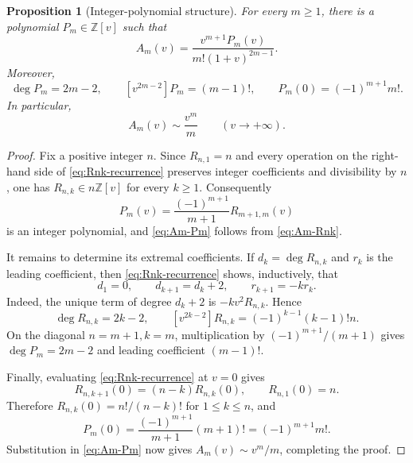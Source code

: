 \documentclass[11pt,oneside]{article}
\theoremstyle{plain}
\newtheorem{proposition}[theorem]{Proposition}
\theoremstyle{definition}
\theoremstyle{remark}
\begin{document}
\begin{proposition}[Integer-polynomial structure]
\label{prop:Pm-structure}
For every \(m\ge1\), there is a polynomial \(P_m\in\mathbb{Z}[v]\) such that
\begin{equation}
 A_m(v)=\frac{v^{m+1}P_m(v)}{m!(1+v)^{2m-1}}.
 \label{eq:Am-Pm}
\end{equation}
Moreover,
\begin{equation}
 \deg P_m=2m-2,
 \qquad [v^{2m-2}]P_m=(m-1)!,
 \qquad P_m(0)=(-1)^{m+1}m!.
 \label{eq:Pm-data}
\end{equation}
In particular,
\begin{equation}
 A_m(v)\sim\frac{v^m}{m}
 \qquad (v\to+\infty).
 \label{eq:Am-leading}
\end{equation}
\end{proposition}

\begin{proof}
Fix a positive integer \(n\).  Since \(R_{n,1}=n\) and every operation on the
right-hand side of \eqref{eq:Rnk-recurrence} preserves integer coefficients
and divisibility by \(n\), one has
\(R_{n,k}\in n\mathbb Z[v]\) for every \(k\ge1\).  Consequently
\[
 P_m(v)=\frac{(-1)^{m+1}}{m+1}R_{m+1,m}(v)
\]
is an integer polynomial, and \eqref{eq:Am-Pm} follows from
\eqref{eq:Am-Rnk}.

It remains to determine its extremal coefficients.  If
\(d_k=\deg R_{n,k}\) and \(r_k\) is the leading coefficient, then
\eqref{eq:Rnk-recurrence} shows, inductively, that
\[
 d_1=0,\qquad d_{k+1}=d_k+2,
 \qquad r_{k+1}=-k r_k.
\]
Indeed, the unique term of degree \(d_k+2\) is
\(-kv^2R_{n,k}\).  Hence
\[
 \deg R_{n,k}=2k-2,
 \qquad [v^{2k-2}]R_{n,k}=(-1)^{k-1}(k-1)!n.
\]
On the diagonal \(n=m+1,k=m\), multiplication by
\((-1)^{m+1}/(m+1)\) gives
\(\deg P_m=2m-2\) and leading coefficient \((m-1)!\).

Finally, evaluating \eqref{eq:Rnk-recurrence} at \(v=0\) gives
\[
 R_{n,k+1}(0)=(n-k)R_{n,k}(0),
 \qquad R_{n,1}(0)=n.
\]
Therefore \(R_{n,k}(0)=n!/(n-k)!\) for \(1\le k\le n\), and
\[
 P_m(0)=\frac{(-1)^{m+1}}{m+1}(m+1)!
       =(-1)^{m+1}m!.
\]
Substitution in \eqref{eq:Am-Pm} now gives
\(A_m(v)\sim v^m/m\), completing the proof.
\end{proof}
\end{document}
